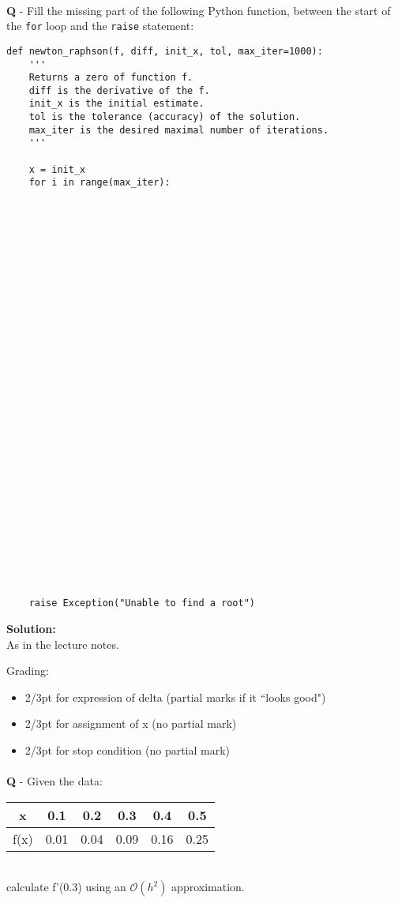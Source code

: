 \documentclass{llncs}
\newcounter{ques}
\renewcommand{\question}[1]{\paragraph{}\textbf{Q\theques} - #1\stepcounter{ques} }
\newcommand{\answer}[1]{\color{red}\textbf{Solution:}\\#1\color{black}}
\begin{document}
\newpage
\question{Fill the missing part of the following Python function, between
the start of the \texttt{for} loop and the \texttt{raise} statement:}

\begin{verbatim}
def newton_raphson(f, diff, init_x, tol, max_iter=1000):
    '''
    Returns a zero of function f.
    diff is the derivative of the f.
    init_x is the initial estimate.
    tol is the tolerance (accuracy) of the solution.
    max_iter is the desired maximal number of iterations.
    '''

    x = init_x
    for i in range(max_iter):































    raise Exception("Unable to find a root")
\end{verbatim}

\answer{
As in the lecture notes.

Grading:
\begin{itemize}
\item 2/3pt for expression of delta (partial marks if it ``looks good")
\item 2/3pt for assignment of x (no partial mark)
\item 2/3pt for stop condition (no partial mark)
\end{itemize}
}


\newpage
\question{Given the data:\\
\begin{tabular}{|c|c|c|c|c|c|}
\hline
x    & 0.1 & 0.2 & 0.3 & 0.4 & 0.5\\
\hline
f(x) & 0.01 & 0.04 & 0.09 & 0.16 & 0.25\\
\hline
\end{tabular}\\
calculate f'(0.3) using an $\mathcal{O}(h^2)$ approximation.
}
\end{document}
